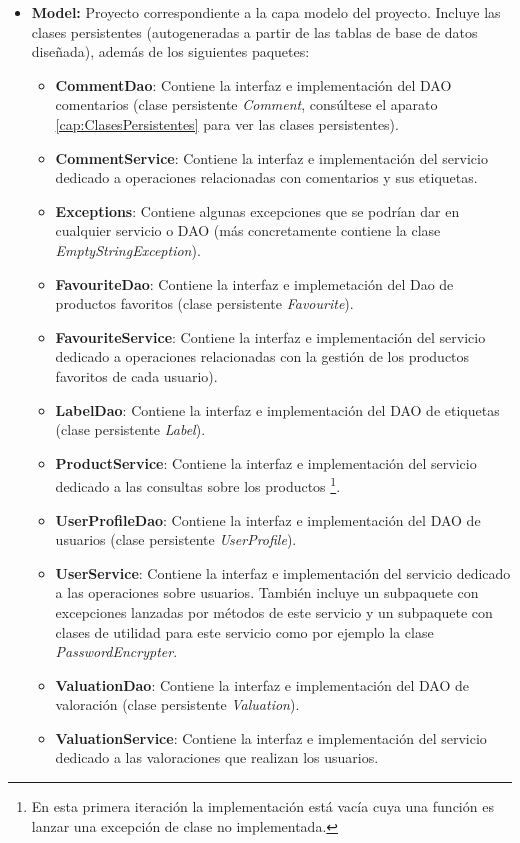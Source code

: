 \documentclass{article}
\begin{document}
\begin{itemize}
	\item \textbf{Model:} Proyecto correspondiente a la capa modelo del proyecto. Incluye las clases persistentes (autogeneradas a partir de las tablas de base de datos diseñada), además de los siguientes paquetes:
	
	\begin{itemize}
		\item \textbf{CommentDao}: Contiene la interfaz e implementación del DAO comentarios (clase persistente \emph{Comment}, consúltese el aparato \ref{cap:ClasesPersistentes} para ver las clases persistentes).
		\item \textbf{CommentService}: Contiene la interfaz e implementación del servicio dedicado a operaciones relacionadas con comentarios y sus etiquetas.
		\item \textbf{Exceptions}: Contiene algunas excepciones que se podrían dar en cualquier servicio o DAO (más concretamente contiene la clase \emph{EmptyStringException}).
		\item \textbf{FavouriteDao}: Contiene la interfaz e implemetación del Dao de productos favoritos (clase persistente \emph{Favourite}).
		\item \textbf{FavouriteService}: Contiene la interfaz e implementación del servicio dedicado a operaciones relacionadas con la gestión de los productos favoritos de cada usuario).
		\item \textbf{LabelDao}: Contiene la interfaz e implementación del DAO de etiquetas (clase persistente \emph{Label}).
		\item \textbf{ProductService}: Contiene la interfaz e implementación del servicio dedicado a las consultas sobre los productos \footnote{En esta primera iteración la implementación está vacía cuya una función es lanzar una excepción de clase no implementada.}.
		\item \textbf{UserProfileDao}: Contiene la interfaz e implementación del DAO de usuarios (clase persistente \emph{UserProfile}).
		\item \textbf{UserService}: Contiene la interfaz e implementación del servicio dedicado a las operaciones sobre usuarios. También incluye un subpaquete con excepciones lanzadas por métodos de este servicio y un subpaquete con clases de utilidad para este servicio como por ejemplo la clase \emph{PasswordEncrypter}.
		\item \textbf{ValuationDao}: Contiene la interfaz e implementación del DAO de valoración (clase persistente \emph{Valuation}).
		\item \textbf{ValuationService}: Contiene la interfaz e implementación del servicio dedicado a las valoraciones que realizan los usuarios.
	\end{itemize}
	

\end{itemize}
\end{document}
